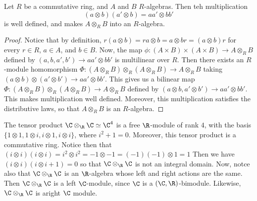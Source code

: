 \begin{lemma}\label{4.4.13}
    Let $R$ be a commutative ring, and  $A$ and  $B$  $R$-algebras. Then teh
    multiplication
    \begin{equation*}
        (a \otimes b)(a' \otimes b)=aa' \otimes bb'
    \end{equation*}
    is well defined, and makes $A \otimes_R B$ into an  $R$-algebra.
\end{lemma}
\begin{proof}
    Notice that by definition, $r(a \otimes b)=ra \otimes b=a \otimes br=(a
    \otimes b)r$ for every $r \in R$, $a \in A$, and $b \in B$. Now, the map
    $\phi:(A \times B) \times (A \times B) \xrightarrow{} A \otimes_R B$ defined
    by $(a,b,a',b') \xrightarrow{} aa' \otimes bb'$ is multilinear over $R$.
    Then there exists an  $R$-module homomorphism  $\Phi:(A \otimes_R B)
    \otimes_R (A \otimes_R B) \xrightarrow{} A \otimes_R B$ taking $(a \otimes
    b) \otimes (a' \otimes b') \xrightarrow{} aa' \otimes bb'$. This gives us a
    bilinear map $\Phi:(A \otimes_R B) \otimes_R (A \otimes_R B) \xrightarrow{} A
    \otimes_R B$ defined by $(a \otimes b, a' \otimes b') \xrightarrow{} aa'
    \otimes bb'$. This makes multiplication well defined. Moreover, this
    multiplication satisfies the distributive laws, so that $A \otimes_R B$ is
    an  $R$-algebra.
\end{proof}

\begin{example}\label{example_4.12}
    The tensor product $\C \otimes_\R \C \simeq \C^4$ is a free $\R$-module of
    rank $4$, with the basis  $\{1 \otimes 1, 1 \otimes i, i \otimes 1, i
    \otimes i\}$, where $i^2+1=0$. Moreover, this tensor product is a
    commutative ring. Notice then that  $(i \otimes i)(i \otimes i)=i^2 \otimes
    i^2=-1 \otimes -1=(-1)(-1) \otimes 1=1$ Then we have $(i \otimes i)(i
    \otimes i+1)=0$ so that $\C \otimes_\R \C$ is not an integral domain. Now,
    notce also that  $\C \otimes_\R \C$ is an  $\R$-algebra whose left and right
    actions are the same. Then  $\C \otimes_\R \C$ is a left  $\C$-module, since
     $\C$ is a  $(\C,\R)$-bimodule. Likewise, $\C \otimes_\R \C$ is aright  $\C$
     module.
\end{example}
